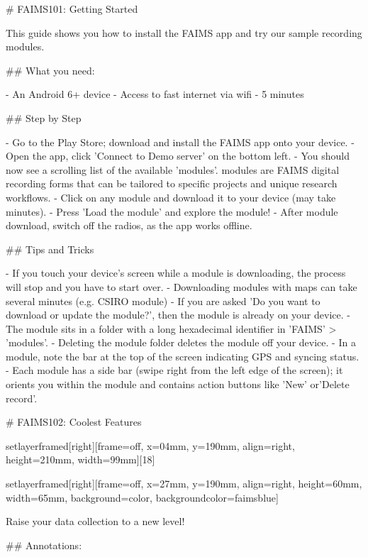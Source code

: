 
# FAIMS101: Getting Started

This guide shows you how to install the FAIMS app and try our sample recording modules.

## What you need:

-  An Android 6+ device
-  Access to fast internet via wifi
-  5 minutes



## Step by Step



-  Go to the Play Store; download and install the FAIMS app onto your device.
-  Open the app, click 'Connect to Demo server' on the bottom left.
-  You should now see a scrolling list of the available 'modules'. modules are FAIMS digital recording forms that can be tailored to specific projects and unique research workflows.
-  Click on any module and download it to your device (may take minutes).
-  Press 'Load the module' and explore the module!
-  After module download, switch off the radios, as the app works offline.







## Tips and Tricks



-  If you touch your device’s screen while a module is downloading, the process will stop and you have to start over.
-  Downloading modules with maps can take several minutes (e.g. CSIRO module)
-  If you are asked 'Do you want to download or update the module?', then the module is already on your device.
-  The module sits in a folder with a long hexadecimal identifier in 'FAIMS' > 'modules'.
-  Deleting the module folder deletes the module off your device.
-  In a module, note the bar at the top of the screen indicating GPS and syncing status.
-  Each module has a side bar (swipe right from the left edge of the screen); it orients you within the module and contains action buttons like 'New' or'Delete record'.



# FAIMS102: Coolest Features


setlayerframed[right][frame=off, x=04mm, y=190mm, align=right, height=210mm, width=99mm][18]


setlayerframed[right][frame=off, x=27mm, y=190mm, align=right, height=60mm, width=65mm, background=color, backgroundcolor=faimsblue]

Raise your data collection to a new level!

## Annotations:

